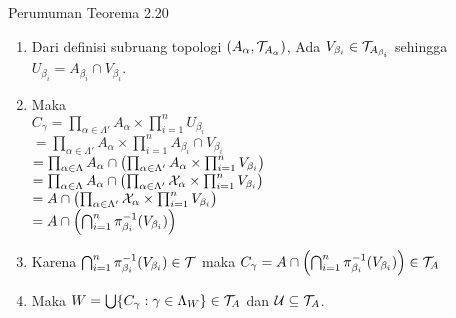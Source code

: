 \begin{frame}{Perumuman Teorema 2.20}
    \begin{tcolorbox}[enhanced,title=Teorema 2.35 (Bukti), frame style tile={width=\paperwidth}{\wallpaper}]
        \begin{enumerate}\addtocounter{enumi}{5}
            \item Dari definisi subruang topologi $(A_\alpha,\nT_{A_\alpha})$, Ada $V_{\beta_i}\in \nT_{A_{\beta_i}}$
             sehingga $U_{\beta_i} = A_{\beta_i} \cap V_{\beta_i}$.
            \item Maka \\
                $C_{\gamma}=\prod_{\alpha\in\Lambda'}A_\alpha\times\prod_{i=1}^n U_{\beta_i}$\\
            $=\prod_{\alpha\in\Lambda'}A_\alpha\times\prod_{i=1}^n A_{\beta_i}\cap V_{\beta_i}$\\
            $=\prod_{\alpha\in\Lambda}A_\alpha\cap\oio*{\prod_{\alpha\in\Lambda'}A_\alpha\times\prod_{i=1}^n V_{\beta_i}}$\\
            $=\prod_{\alpha\in\Lambda}A_\alpha\cap\oio*{\prod_{\alpha\in\Lambda'}\nX_\alpha\times\prod_{i=1}^n V_{\beta_i}}$\\
            $=A \cap \oio*{\prod_{\alpha\in\Lambda'}\nX_\alpha\times\prod_{i=1}^n V_{\beta_i}}$\\
            $=A\cap \oio*{\bigcap_{i=1}^n \pi_{\beta_i}^{-1}(V_{\beta_i})}$
            \item Karena $\bigcap_{i=1}^n \pi_{\beta_i}^{-1}(V_{\beta_i}) \in \nT$ maka $C_\gamma = A\cap \oio*{\bigcap_{i=1}^n \pi_{\beta_i}^{-1}(V_{\beta_i})} \in \nT_A$
            \item Maka $W = \bigcup\set*{C_\gamma : \gamma \in \Lambda_W}\in \nT_A$ dan $\nU \subseteq \nT_A$. 
        \end{enumerate}
    \end{tcolorbox}
\end{frame}

